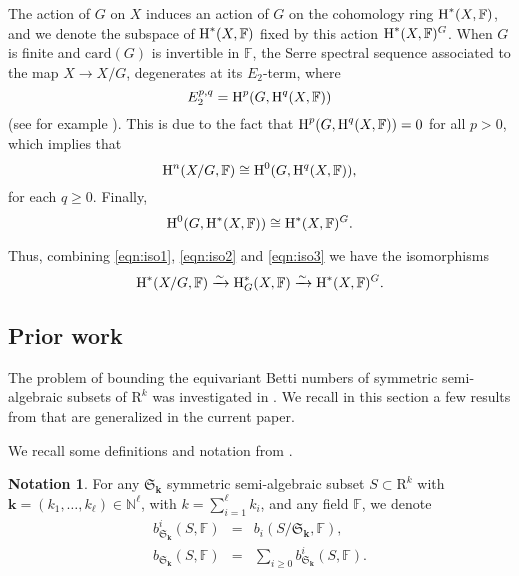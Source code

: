 \documentclass{amsart}
\theoremstyle{definition}
\newtheorem{notation}{Notation}
\theoremstyle{remark}
\numberwithin{equation}{section}
\begin{document}
The action of $G$ on $X$ induces an action of  $G$ on the 
cohomology ring ${\mbox{\rm H}}^*(X,{\mathbb{F}})$, and we denote the subspace of  ${\mbox{\rm H}}^*(X,{\mathbb{F}})$ fixed by this action
${\mbox{\rm H}}^*(X,{\mathbb{F}})^G$. 
When $G$ is finite and ${\mathrm{card}}(G)$ is invertible in ${\mathbb{F}}$, 
the Serre spectral sequence associated to the map $X\rightarrow X/G$, degenerates at its $E_2$-term, 
where 
\[
E_2^{p,q} = {\mbox{\rm H}}^p(G,{\mbox{\rm H}}^q(X,{\mathbb{F}}))
\]
(see for example \cite[Section VII.7]{Brown-book}).
This is due to the fact that  ${\mbox{\rm H}}^p(G,{\mbox{\rm H}}^q(X,{\mathbb{F}}))= 0$ for all $p > 0$, 
which implies that 
\begin{equation}
\label{eqn:iso2}
{\mbox{\rm H}}^n(X/G,{\mathbb{F}}) \cong  {\mbox{\rm H}}^0(G,{\mbox{\rm H}}^q(X,{\mathbb{F}})), 
\end{equation}
for each $q \geq 0$.
Finally, 
\begin{equation}
\label{eqn:iso3}
{\mbox{\rm H}}^0(G,{\mbox{\rm H}}^\ast(X,{\mathbb{F}})) \cong {\mbox{\rm H}}^\ast(X,{\mathbb{F}})^G.
\end{equation}

Thus, combining \eqref{eqn:iso1}, \eqref{eqn:iso2} and \eqref{eqn:iso3} we have the isomorphisms
\begin{equation}
\label{eqn:iso}
{\mbox{\rm H}}^{\ast} (X/G,{\mathbb{F}}) \xrightarrow{\sim} {\mbox{\rm H}}_{G}^{\ast} (X,{\mathbb{F}}
) \xrightarrow{\sim} {\mbox{\rm H}}^\ast(X,{\mathbb{F}})^G.
\end{equation}

\subsection{Prior work}
\label{subsec:prior-work}
The problem of bounding the equivariant Betti numbers of symmetric semi-algebraic subsets of 
${\mathrm{R}}^k$ was investigated in \cite{BC2013}. We recall in this section a few results from
\cite{BC2013} that are generalized in the current paper.

We recall some definitions and notation from \cite{BC2013}.

\begin{notation}
  \label{not:equivariant-betti} 
  For any $\mathfrak{S}_{\mathbf{k}}$ symmetric
  semi-algebraic subset $S \subset {\mathrm{R}}^{k}$ with $\mathbf{k}= (k_{1} , \ldots
  ,k_{\ell}) \in {\mathbb{N}}^{\ell}$, with $k= \sum_{i=1}^{\ell} k_{i}$,
  and any field ${\mathbb{F}}$,  we denote
  \begin{eqnarray*}
    b_{\mathfrak{S}_{\mathbf{k}}}^{i} (S,{\mathbb{F}}) & =  & b_{i} (S/\mathfrak{S}_{\mathbf{k}} ,{\mathbb{F}}) ,\\
    b_{\mathfrak{S}_{\mathbf{k}}} (S,{\mathbb{F}}) & = & \sum_{i \geq 0}
    b_{\mathfrak{S}_{\mathbf{k}}}^{i} (S,{\mathbb{F}}).
  \end{eqnarray*}
\end{notation}
\end{document}
